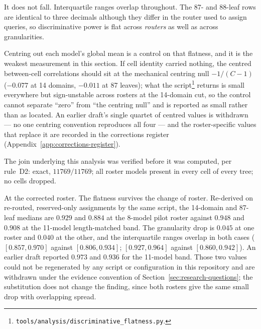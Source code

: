 It does not fall. Interquartile ranges overlap throughout. The 87- and
88-leaf rows are identical to three decimals although they differ in
the router used to assign queries, so discriminative power is flat
across \emph{routers} as well as across granularities.

Centring out each model's global mean is a control on that flatness,
and it is the weakest measurement in this section. If cell identity
carried nothing, the centred between-cell correlations should sit at
the mechanical centring null $-1/(C-1)$ ($-0.077$ at 14 domains,
$-0.011$ at 87 leaves); what the script\footnote{%
\texttt{tools/analysis/discriminative\_flatness.py}.} returns is
small everywhere but sign-unstable across rosters at the 14-domain
cut, so the control cannot separate ``zero'' from ``the centring
null'' and is reported as small rather than as located. An earlier
draft's single quartet of centred values is withdrawn --- no one
centring convention reproduces all four --- and the roster-specific
values that replace it are recorded in the corrections register
(Appendix~\ref{app:corrections-register}).

The join underlying this analysis was verified before it was computed,
per rule~D2: exact, $11769/11769$; all roster models present in every
cell of every tree; no cells dropped.

At the corrected roster. The flatness survives the
change of roster. Re-derived on re-routed, reserved-only assignments
by the same script, the 14-domain and
87-leaf medians are $0.929$ and $0.884$ at the 8-model pilot roster
against $0.948$ and $0.908$ at the 11-model length-matched band. The
granularity drop is $0.045$ at one roster and $0.040$ at the other, and
the interquartile ranges overlap in both cases ($[0.857, 0.970]$
against $[0.806, 0.934]$; $[0.927, 0.964]$ against $[0.860, 0.942]$).
An earlier draft reported $0.973$ and $0.936$ for the 11-model band.
Those two values could not be regenerated by any script or
configuration in this repository and are withdrawn under the evidence
convention of Section~\ref{sec:research-questions}; the substitution
does not change the finding, since both rosters give the same small
drop with overlapping spread.


